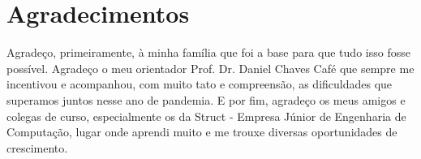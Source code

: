 \chapter*{Agradecimentos}

Agradeço, primeiramente, à minha família que foi a base para que tudo isso fosse possível. Agradeço o meu orientador Prof. Dr. Daniel Chaves Café que sempre me incentivou e acompanhou, com muito tato e compreensão, as dificuldades que superamos juntos nesse ano de pandemia. E por fim, agradeço os meus amigos e colegas de curso, especialmente os da Struct - Empresa Júnior de Engenharia de Computação, lugar onde aprendi muito e me trouxe diversas oportunidades de crescimento. 